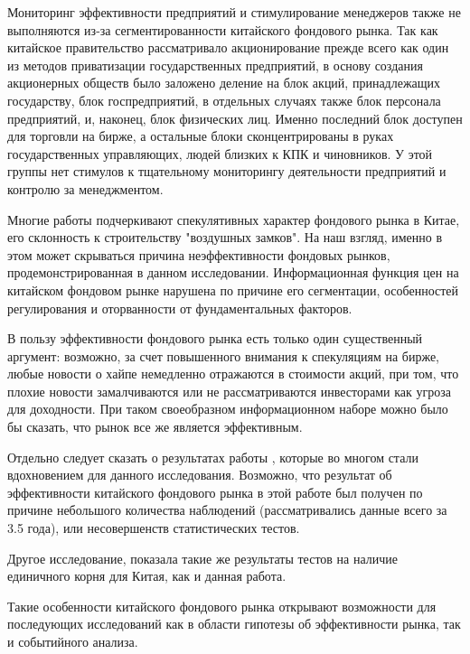 \documentclass[a4paper,12pt]{article}
\begin{document}
Мониторинг эффективности предприятий и стимулирование менеджеров также не выполняются из-за сегментированности китайского фондового рынка. Так как китайское правительство рассматривало акционирование прежде всего как один из методов приватизации государственных предприятий, в основу создания акционерных обществ было заложено деление на блок акций, принадлежащих государству, блок госпредприятий, в отдельных случаях также блок персонала предприятий, и, наконец, блок физических лиц. Именно последний блок доступен для торговли на бирже, а остальные блоки сконцентрированы в руках государственных управляющих, людей близких к КПК и чиновников. У этой группы нет стимулов к тщательному мониторингу деятельности предприятий и контролю за менеджментом.

Многие работы подчеркивают спекулятивных характер фондового рынка в Китае, его склонность к строительству "воздушных замков". На наш взгляд, именно в этом может скрываться причина неэффективности фондовых рынков, продемонстрированная в данном исследовании. Информационная функция цен на китайском фондовом рынке нарушена по причине его сегментации, особенностей регулирования и оторванности от фундаментальных факторов.

В пользу эффективности фондового рынка есть только один существенный аргумент: возможно, за счет повышенного внимания к спекуляциям на бирже, любые новости о хайпе немедленно отражаются в стоимости акций, при том, что плохие новости замалчиваются или не рассматриваются инвесторами как угроза для доходности. При таком своеобразном информационном наборе можно было бы сказать, что рынок все же является эффективным.

Отдельно следует сказать о результатах работы \cite{Liu1997}, которые во многом стали вдохновением для данного исследования. Возможно, что результат об эффективности китайского фондового рынка в этой работе был получен по причине небольшого количества наблюдений (рассматривались данные всего за 3.5 года), или несовершенств статистических тестов.

Другое исследование, \cite{Wang2015} показала такие же результаты тестов на наличие единичного корня для Китая, как и данная работа.

Такие особенности китайского фондового рынка открывают возможности для последующих исследований как в области гипотезы об эффективности рынка, так и событийного анализа.
\newpage


\thispagestyle{empty}
\end{document}
